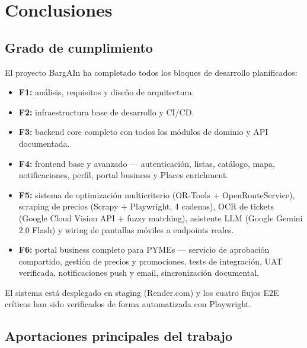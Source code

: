 
\chapter{Conclusiones}\label{cap11}

\section{Grado de cumplimiento}\label{sec:cumplimiento}

El proyecto BargAIn ha completado todos los bloques de desarrollo planificados:

\begin{itemize}
  \item \textbf{F1:} an\'alisis, requisitos y dise\~no de arquitectura.
  \item \textbf{F2:} infraestructura base de desarrollo y CI/CD.
  \item \textbf{F3:} backend core completo con todos los m\'odulos de dominio y API documentada.
  \item \textbf{F4:} frontend base y avanzado --- autenticaci\'on, listas, cat\'alogo, mapa,
    notificaciones, perfil, portal business y Places enrichment.
  \item \textbf{F5:} sistema de optimizaci\'on multicriterio (OR-Tools + OpenRouteService),
    scraping de precios (Scrapy + Playwright, 4 cadenas), OCR de tickets (Google Cloud Vision API
    + fuzzy matching), asistente LLM (Google Gemini 2.0 Flash) y wiring de pantallas m\'oviles a
    endpoints reales.
  \item \textbf{F6:} portal business completo para PYMEs --- servicio de aprobaci\'on compartido,
    gesti\'on de precios y promociones, tests de integraci\'on, UAT verificada, notificaciones push
    y email, sincronizaci\'on documental.
\end{itemize}

El sistema est\'a desplegado en staging (Render.com) y los cuatro flujos E2E cr\'iticos han sido
verificados de forma automatizada con Playwright.

\section{Aportaciones principales del trabajo}\label{sec:aportaciones}

